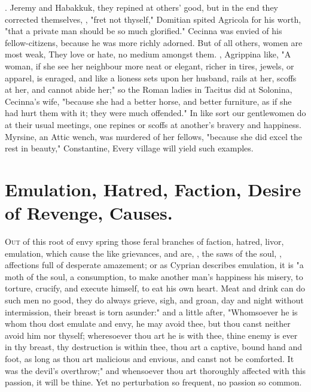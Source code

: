 . Jeremy and
Habakkuk, they repined at others' good, but in the end
they corrected themselves, , "fret not thyself," \etc{}
Domitian spited Agricola for his worth, "that a private
man should be so much glorified." Cecinna was envied of
his fellow-citizens, because he was more richly adorned. But of all others,
women are most weak,  They
love or hate, no medium amongst them. , Agrippina like, "A woman, if she see her
neighbour more neat or elegant, richer in tires, jewels, or apparel, is
enraged, and like a lioness sets upon her husband, rails at her, scoffs at her,
and cannot abide her;" so the Roman ladies in Tacitus did at Solonina,
Cecinna's wife, "because she had a better horse, and
better furniture, as if she had hurt them with it; they were much offended." In
like sort our gentlewomen do at their usual meetings, one repines or scoffs at
another's bravery and happiness. Myrsine, an Attic wench, was murdered of her
fellows, "because she did excel the rest in beauty,"
Constantine,  Every village will
yield such examples.

\section{Emulation, Hatred, Faction, Desire of Revenge, Causes.}

\lettrine{O}{ut} of this root of envy spring those feral
branches of faction, hatred, livor, emulation, which cause the like grievances,
and are, , the saws of the soul,
, affections full of
desperate amazement; or as Cyprian describes emulation, it is
"a moth of the soul, a consumption, to make another man's
happiness his misery, to torture, crucify, and execute himself, to eat his own
heart. Meat and drink can do such men no good, they do always grieve, sigh, and
groan, day and night without intermission, their breast is torn asunder:" and a
little after, "Whomsoever he is whom thou dost emulate and
envy, he may avoid thee, but thou canst neither avoid him nor thyself;
wheresoever thou art he is with thee, thine enemy is ever in thy breast, thy
destruction is within thee, thou art a captive, bound hand and foot, as long as
thou art malicious and envious, and canst not be comforted. It was the devil's
overthrow;" and whensoever thou art thoroughly affected with this passion, it
will be thine. Yet no perturbation so frequent, no passion so common.

